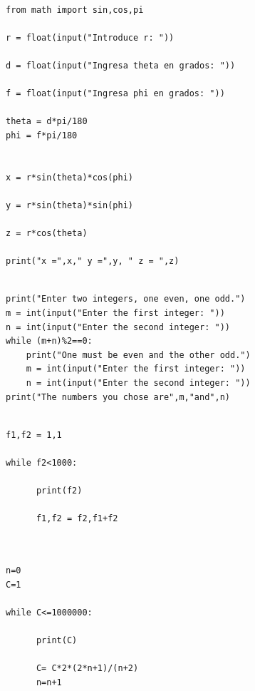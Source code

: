\documentclass[11pt,spanish]{article}
\begin{document}
\begin{lstlisting}[caption=esfericas.py] 

from math import sin,cos,pi

r = float(input("Introduce r: "))

d = float(input("Ingresa theta en grados: "))

f = float(input("Ingresa phi en grados: "))

theta = d*pi/180
phi = f*pi/180 


x = r*sin(theta)*cos(phi)

y = r*sin(theta)*sin(phi)

z = r*cos(theta)

print("x =",x," y =",y, " z = ",z)

\end{lstlisting}


\begin{lstlisting}[caption=EvenOdd.py] 

print("Enter two integers, one even, one odd.")
m = int(input("Enter the first integer: "))
n = int(input("Enter the second integer: "))
while (m+n)%2==0:
    print("One must be even and the other odd.")
    m = int(input("Enter the first integer: "))
    n = int(input("Enter the second integer: "))
print("The numbers you chose are",m,"and",n)

\end{lstlisting}

\begin{lstlisting}[caption=Fibonacci.py] 

f1,f2 = 1,1

while f2<1000:

      print(f2)

      f1,f2 = f2,f1+f2
      
\end{lstlisting}

\begin{lstlisting}[caption=Catalan.py] 

n=0
C=1

while C<=1000000:

      print(C)

      C= C*2*(2*n+1)/(n+2)
      n=n+1     
      
\end{lstlisting}
\end{document}
